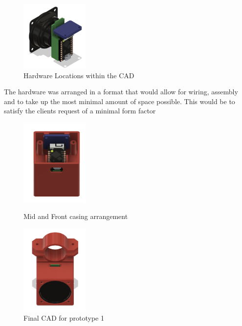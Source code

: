 {    \begin{figure}[H]
        \centering %
            \includegraphics[width=0.3\textwidth,keepaspectratio, angle=0]{./figures/hardware.png}
            \caption{Hardware Locations within the CAD}
        \label{fig:hardware}
    \end{figure}

The hardware was arranged in a format that would allow for wiring, assembly and to take up the most minimal amount of space possible. This would be to satisfy the clients request of a minimal form factor

    \begin{figure}[H]
        \centering %
            \includegraphics[width=0.3\textwidth,keepaspectratio, angle=0]{./figures/interior.png}
            \caption{Mid and Front casing arrangement}
            
            \includegraphics[width=0.3\textwidth,keepaspectratio, angle=0]{./figures/final-cad.png}
            \caption{Final CAD for prototype 1}
        \label{fig:interior}
    \end{figure}

}
